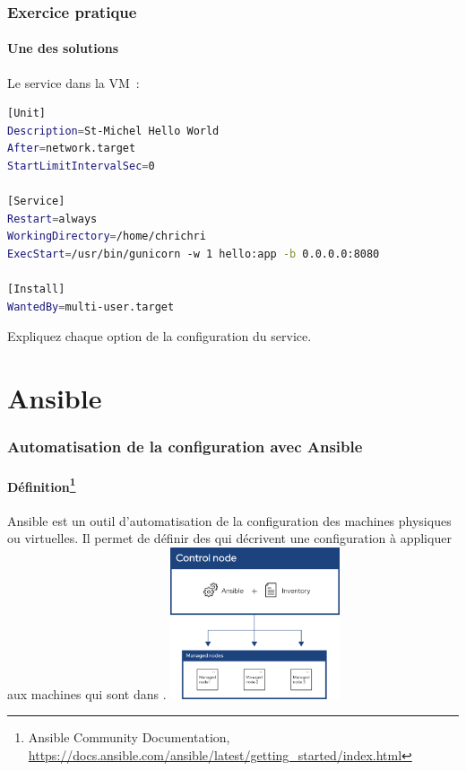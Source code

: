 \documentclass{beamer}
\begin{document}
    \begin{frame}[fragile]
        \transdissolve
        \frametitle{Exercice pratique}
        \framesubtitle{Une des solutions}
        Le service dans la VM~:
        \begin{lstlisting}[language=bash]
[Unit]
Description=St-Michel Hello World
After=network.target
StartLimitIntervalSec=0

[Service]
Restart=always
WorkingDirectory=/home/chrichri
ExecStart=/usr/bin/gunicorn -w 1 hello:app -b 0.0.0.0:8080

[Install]
WantedBy=multi-user.target
        \end{lstlisting}
        Expliquez chaque option de la configuration du service.
    \end{frame}


    \section{Ansible}\label{sec:ansible}

    \begin{frame}
        \transdissolve
        \frametitle{Automatisation de la configuration avec Ansible}
        \framesubtitle{Définition\footnote{Ansible Community Documentation, \url{https://docs.ansible.com/ansible/latest/getting_started/index.html}}}
        Ansible est un outil d'automatisation de la configuration des machines physiques ou virtuelles.
        Il permet de définir des  qui décrivent une configuration à appliquer aux machines qui sont dans  .
        \bigbreak
        \centering
        \includegraphics[width=5cm]{image/ansible.png}
    \end{frame}
\end{document}
